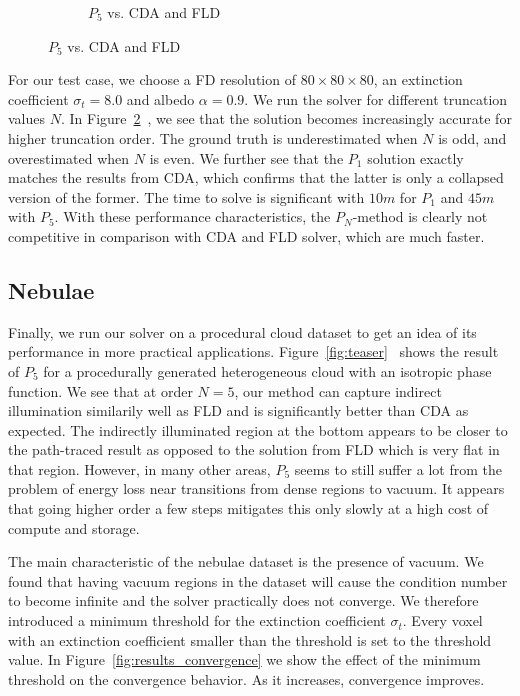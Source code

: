 \begin{figure}[h]
\begin{subfigure}{0.45\columnwidth}
\caption{$P_5$ vs. CDA and FLD}
\label{fig:pointsource_p5}
\end{subfigure}%
\vspace{-0.1in}
\label{fig:pointsource}
\end{figure}

For our test case, we choose a FD resolution of $80\times80\times80$, an extinction coefficient $\sigma_t=8.0$ and albedo $\alpha=0.9$. We run the solver for different truncation values $N$. In Figure~\ref{fig:pointsource}~, we see that the solution becomes increasingly accurate for higher truncation order. The ground truth is underestimated when $N$ is odd, and overestimated when $N$ is even. We further see that the $P_1$ solution exactly matches the results from CDA, which confirms that the latter is only a collapsed version of the former. The time to solve is significant with $10m$ for $P_1$ and $45m$ with $P_5$. With these performance characteristics, the $P_N$-method is clearly not competitive in comparison with CDA and FLD solver, which are much faster.

\subsection{Nebulae}

Finally, we run our solver on a procedural cloud dataset to get an idea of its performance in more practical applications. Figure~\ref{fig:teaser}~ shows the result of $P_5$ for a procedurally generated heterogeneous cloud with an isotropic phase function. We see that at order $N=5$, our method can capture indirect illumination similarily well as FLD and is significantly better than CDA as expected. The indirectly illuminated region at the bottom appears to be closer to the path-traced result as opposed to the solution from FLD which is very flat in that region. However, in many other areas, $P_5$ seems to still suffer a lot from the problem of energy loss near transitions from dense regions to vacuum. It appears that going higher order a few steps mitigates this only slowly at a high cost of compute and storage.

The main characteristic of the nebulae dataset is the presence of vacuum. We found that having vacuum regions in the dataset will cause the condition number to become infinite and the solver practically does not converge. We therefore introduced a minimum threshold for the extinction coefficient $\sigma_t$. Every voxel with an extinction coefficient smaller than the threshold is set to the threshold value. In Figure~\ref{fig:results_convergence} we show the effect of the minimum threshold on the convergence behavior. As it increases, convergence improves.

